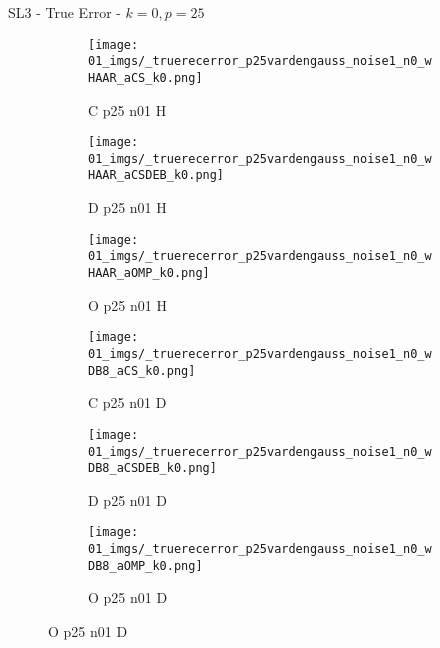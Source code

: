 \begin{frame}{SL3 - True Error - $k=0,p=25$}{}
\begin{figure}
\begin{subfigure}{0.13\textwidth}
\texttt{[image: 01\_imgs/\_truerecerror\_p25vardengauss\_noise1\_n0\_wHAAR\_aCS\_k0.png]}
\caption*{\tiny C p25 n01 H}
\end{subfigure}
\begin{subfigure}{0.13\textwidth}
\texttt{[image: 01\_imgs/\_truerecerror\_p25vardengauss\_noise1\_n0\_wHAAR\_aCSDEB\_k0.png]}
\caption*{\tiny D p25 n01 H}
\end{subfigure}
\begin{subfigure}{0.13\textwidth}
\texttt{[image: 01\_imgs/\_truerecerror\_p25vardengauss\_noise1\_n0\_wHAAR\_aOMP\_k0.png]}
\caption*{\tiny O p25 n01 H}
\end{subfigure}
\begin{subfigure}{0.13\textwidth}
\texttt{[image: 01\_imgs/\_truerecerror\_p25vardengauss\_noise1\_n0\_wDB8\_aCS\_k0.png]}
\caption*{\tiny C p25 n01 D}
\end{subfigure}
\begin{subfigure}{0.13\textwidth}
\texttt{[image: 01\_imgs/\_truerecerror\_p25vardengauss\_noise1\_n0\_wDB8\_aCSDEB\_k0.png]}
\caption*{\tiny D p25 n01 D}
\end{subfigure}
\begin{subfigure}{0.13\textwidth}
\texttt{[image: 01\_imgs/\_truerecerror\_p25vardengauss\_noise1\_n0\_wDB8\_aOMP\_k0.png]}
\caption*{\tiny O p25 n01 D}
\end{subfigure}

\vspace{5pt}


\end{figure}
\end{frame}
